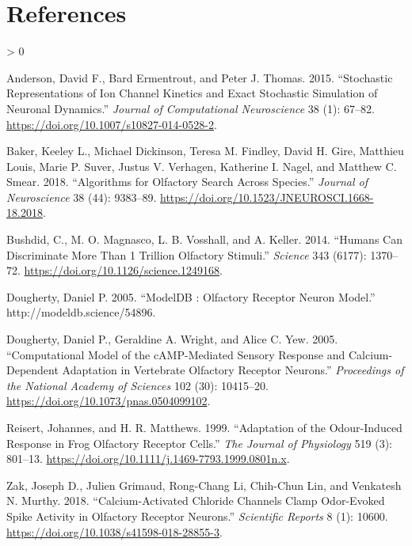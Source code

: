 \documentclass[
]{article}
\newlength{\cslhangindent}
\newenvironment{CSLReferences}[2] %
 {%
  \setlength{\parindent}{0pt}
  \ifodd #1 \everypar{\setlength{\hangindent}{\cslhangindent}}\ignorespaces\fi
  \ifnum #2 > 0
  \setlength{\parskip}{#2\baselineskip}
  \fi
 }%
 {}
\begin{document}
\hypertarget{references}{%
\section*{References}\label{references}}

\hypertarget{refs}{}
\begin{CSLReferences}{1}{0}
\leavevmode\hypertarget{ref-anderson15stochastica}{}%
Anderson, David F., Bard Ermentrout, and Peter J. Thomas. 2015. {``Stochastic Representations of Ion Channel Kinetics and Exact Stochastic Simulation of Neuronal Dynamics.''} \emph{Journal of Computational Neuroscience} 38 (1): 67--82. \url{https://doi.org/10.1007/s10827-014-0528-2}.

\leavevmode\hypertarget{ref-baker18algorithmsa}{}%
Baker, Keeley L., Michael Dickinson, Teresa M. Findley, David H. Gire, Matthieu Louis, Marie P. Suver, Justus V. Verhagen, Katherine I. Nagel, and Matthew C. Smear. 2018. {``Algorithms for {Olfactory Search} Across {Species}.''} \emph{Journal of Neuroscience} 38 (44): 9383--89. \url{https://doi.org/10.1523/JNEUROSCI.1668-18.2018}.

\leavevmode\hypertarget{ref-bushdid14humans}{}%
Bushdid, C., M. O. Magnasco, L. B. Vosshall, and A. Keller. 2014. {``Humans {Can Discriminate More} Than 1 {Trillion Olfactory Stimuli}.''} \emph{Science} 343 (6177): 1370--72. \url{https://doi.org/10.1126/science.1249168}.

\leavevmode\hypertarget{ref-dougherty05modeldb}{}%
Dougherty, Daniel P. 2005. {``{ModelDB} : {Olfactory} Receptor Neuron Model.''} http://modeldb.science/54896.

\leavevmode\hypertarget{ref-dougherty05computational}{}%
Dougherty, Daniel P., Geraldine A. Wright, and Alice C. Yew. 2005. {``Computational Model of the {cAMP}-Mediated Sensory Response and Calcium-Dependent Adaptation in Vertebrate Olfactory Receptor Neurons.''} \emph{Proceedings of the National Academy of Sciences} 102 (30): 10415--20. \url{https://doi.org/10.1073/pnas.0504099102}.

\leavevmode\hypertarget{ref-reisert99adaptation}{}%
Reisert, Johannes, and H. R. Matthews. 1999. {``Adaptation of the Odour-Induced Response in Frog Olfactory Receptor Cells.''} \emph{The Journal of Physiology} 519 (3): 801--13. \url{https://doi.org/10.1111/j.1469-7793.1999.0801n.x}.

\leavevmode\hypertarget{ref-zak18calciumactivated}{}%
Zak, Joseph D., Julien Grimaud, Rong-Chang Li, Chih-Chun Lin, and Venkatesh N. Murthy. 2018. {``Calcium-Activated Chloride Channels Clamp Odor-Evoked Spike Activity in Olfactory Receptor Neurons.''} \emph{Scientific Reports} 8 (1): 10600. \url{https://doi.org/10.1038/s41598-018-28855-3}.

\end{CSLReferences}
\end{document}
